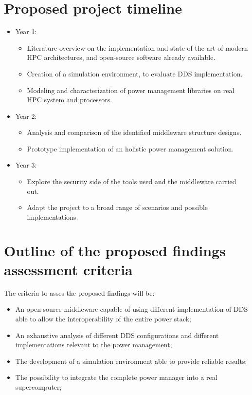 \section{Proposed project timeline}
\begin{itemize}
\item{Year 1:
\begin{itemize}
    \item Literature overview on the implementation and state of the art of modern HPC architectures, and open-source software already available.
    \item Creation of a simulation environment, to evaluate DDS implementation.
    \item Modeling and characterization of power management libraries on real HPC system and processors.
\end{itemize}}
\item{Year 2:
\begin{itemize}
    \item Analysis and comparison of the identified middleware structure designs.
    \item Prototype implementation of an holistic power management solution.
\end{itemize}}
\item{Year 3:
\begin{itemize}
    \item Explore the security side of the tools used and the middleware carried out.
    \item Adapt the project to a broad range of scenarios and possible implementations.
\end{itemize}}
\end{itemize}

\section{Outline of the proposed findings assessment criteria}
The criteria to asses the proposed findings will be:
\begin{itemize}
    \item An open-source middleware capable of using different implementation of DDS able to allow the interoperability of the entire power stack;
    \item An exhaustive analysis of different DDS configurations and different implementations relevant to the power management;
    \item The development of a simulation environment able to provide reliable results;
    \item The possibility to integrate the complete power manager into a real supercomputer;
\end{itemize}
